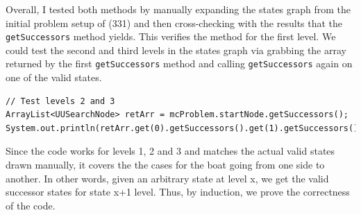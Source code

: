 \documentclass[a4paper]{report}
\begin{document}
Overall, I tested both methods by manually expanding the states graph from the initial problem setup of
(331) and then cross-checking with the results that the \verb`getSuccessors` method yields. This verifies
the method for the first level. We could test the second and third levels in the states graph via grabbing
the array returned by the first \verb`getSuccessors` method and calling \verb`getSuccessors` again on 
one of the valid states.

\begin{lstlisting}
// Test levels 2 and 3
ArrayList<UUSearchNode> retArr = mcProblem.startNode.getSuccessors();
System.out.println(retArr.get(0).getSuccessors().get(1).getSuccessors());
\end{lstlisting}

Since the code works for levels 1, 2 and 3 and matches the actual valid states drawn manually, 
it covers the the cases for the boat going from one side to another. In other words, given an arbitrary
state at level x, we get the valid successor states for state x+1 level. Thus, by induction, we prove
the correctness of the code.
\end{document}
